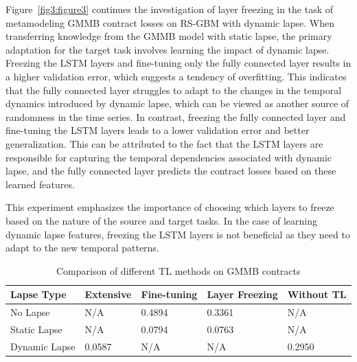 Figure~\ref{fig3:figure3} continues the investigation of layer freezing in the task of metamodeling GMMB contract losses on RS-GBM with dynamic lapse. 
When transferring knowledge from the GMMB model with static lapse, the primary adaptation for the target task involves learning the impact of dynamic lapse.
Freezing the LSTM layers and fine-tuning only the fully connected layer results in a higher validation error, which suggests a tendency of overfitting.
This indicates that the fully connected layer struggles to adapt to the changes in the temporal dynamics introduced by dynamic lapse, which can be viewed as another source of randomness in the time series.
In contrast, freezing the fully connected layer and fine-tuning the LSTM layers leads to a lower validation error and better generalization. 
This can be attributed to the fact that the LSTM layers are responsible for capturing the temporal dependencies associated with dynamic lapse, and the fully connected layer predicts the contract losses based on these learned features.

This experiment emphasizes the importance of choosing which layers to freeze based on the nature of the source and target tasks. 
In the case of learning dynamic lapse features, freezing the LSTM layers is not beneficial as they need to adapt to the new temporal patterns.

\begin{table}[ht!]
    \centering
    \begin{tabular}{lllll}
    \toprule
    \textbf{Lapse Type} & \textbf{Extensive} & \textbf{Fine-tuning} & \textbf{Layer Freezing} & \textbf{Without TL} \\
    \midrule
    No Lapse & N/A & 0.4894 & 0.3361 & N/A \\
    Static Lapse & N/A & 0.0794 & 0.0763 & N/A \\
    Dynamic Lapse & 0.0587 &  N/A &  N/A & 0.2950 \\
    \bottomrule
    \end{tabular}
    \caption{Comparison of different TL methods on GMMB contracts}
    \label{tab3:transfer_learning_results}
\end{table}

